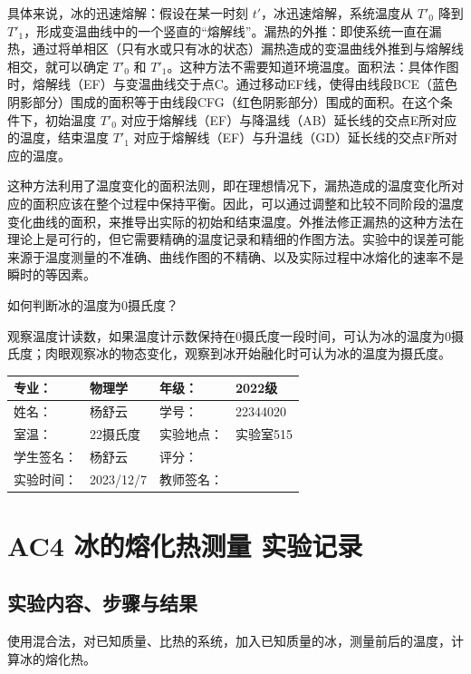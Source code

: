 \documentclass[dvipsnames, svgnames,a4paper,11pt]{article}
\begin{document}
	具体来说，冰的迅速熔解：假设在某一时刻 \( t' \)，冰迅速熔解，系统温度从 \( T'_0 \) 降到 \( T'_1 \)，形成变温曲线中的一个竖直的“熔解线”。漏热的外推：即使系统一直在漏热，通过将单相区（只有水或只有冰的状态）漏热造成的变温曲线外推到与熔解线相交，就可以确定 \( T'_0 \) 和 \( T'_1 \)。这种方法不需要知道环境温度。面积法：具体作图时，熔解线（EF）与变温曲线交于点C。通过移动EF线，使得由线段BCE（蓝色阴影部分）围成的面积等于由线段CFG（红色阴影部分）围成的面积。在这个条件下，初始温度 \( T'_0 \) 对应于熔解线（EF）与降温线（AB）延长线的交点E所对应的温度，结束温度 \( T'_1 \) 对应于熔解线（EF）与升温线（GD）延长线的交点F所对应的温度。
	
	这种方法利用了温度变化的面积法则，即在理想情况下，漏热造成的温度变化所对应的面积应该在整个过程中保持平衡。因此，可以通过调整和比较不同阶段的温度变化曲线的面积，来推导出实际的初始和结束温度。外推法修正漏热的这种方法在理论上是可行的，但它需要精确的温度记录和精细的作图方法。实验中的误差可能来源于温度测量的不准确、曲线作图的不精确、以及实际过程中冰熔化的速率不是瞬时的等因素。
	
	\begin{question}
		如何判断冰的温度为0摄氏度？
	\end{question}
	观察温度计读数，如果温度计示数保持在0摄氏度一段时间，可认为冰的温度为0摄氏度；肉眼观察冰的物态变化，观察到冰开始融化时可认为冰的温度为摄氏度。
	
	\clearpage
	\begin{table}
		\renewcommand\arraystretch{1.7}
		\centering
		\begin{tabularx}{\textwidth}{|X|X|X|X|}
			\hline
			专业： & 物理学 & 年级： & 2022级 \\
			\hline
			姓名： & 杨舒云 & 学号： & 22344020\\
			\hline
			室温： & 22摄氏度 & 实验地点： & 实验室515 \\
			\hline
			学生签名：& 杨舒云 & 评分： &\\
			\hline
			实验时间：& 2023/12/7 & 教师签名：&\\
			\hline
		\end{tabularx}
	\end{table}
	
	\section{AC4 冰的熔化热测量 \quad\heiti 实验记录}
	\subsection{实验内容、步骤与结果}
	使用混合法，对已知质量、比热的系统，加入已知质量的冰，测量前后的温度，计算冰的熔化热。
	
\end{document}
